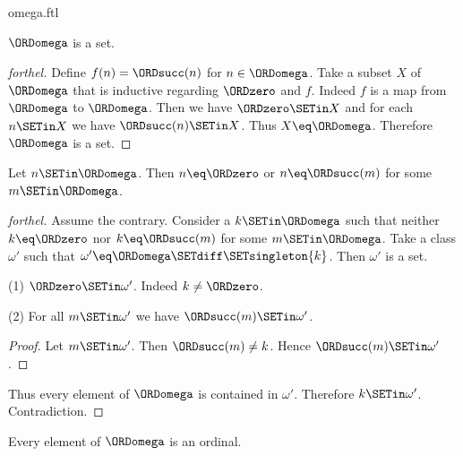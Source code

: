 \documentclass{stex}
\begin{document}
\begin{smodule}{omega.ftl}
\begin{corollary}[forthel,id=SET_THEORY_03_4847727433220096]
  $\ORDomega$ is a set.
\end{corollary}
\begin{proof}[forthel]
  Define $f(n) = \ORDsucc(n)$ for $n \in \ORDomega$.
  Take a subset $X$ of $\ORDomega$ that is inductive regarding $\ORDzero$ and $f$.
  Indeed $f$ is a map from $\ORDomega$ to $\ORDomega$.
  Then we have $\ORDzero \SETin X$ and for each $n \SETin X$ we have $\ORDsucc(n) \SETin X$.
  Thus $X \eq \ORDomega$.
  Therefore $\ORDomega$ is a set.
\end{proof}

\begin{proposition}[forthel,id=SET_THEORY_03_5885789275684864]
  Let $n \SETin \ORDomega$.
  Then $n \eq \ORDzero$ or $n \eq \ORDsucc(m)$ for some $m \SETin \ORDomega$.
\end{proposition}
\begin{proof}[forthel]
  Assume the contrary.
  Consider a $k \SETin \ORDomega$ such that neither $k \eq \ORDzero$ nor $k \eq \ORDsucc(m)$ for
  some $m \SETin \ORDomega$.
  Take a class $\omega'$ such that $\omega' \eq \ORDomega \SETdiff \SETsingleton{k}$. %
  Then $\omega'$ is a set.

  (1) $\ORDzero \SETin \omega'$.
  Indeed $k \neq \ORDzero$.

  (2) For all $m \SETin \omega'$ we have $\ORDsucc(m) \SETin \omega'$.
  \begin{proof}
    Let $m \SETin \omega'$.
    Then $\ORDsucc(m) \neq k$.
    Hence $\ORDsucc(m) \SETin \omega'$.
  \end{proof}

  Thus every element of $\ORDomega$ is contained in $\omega'$.
  Therefore $k \SETin \omega'$.
  Contradiction.
\end{proof}

\begin{proposition}[forthel,id=SET_THEORY_03_5057540872208384]
  Every element of $\ORDomega$ is an ordinal.
\end{proposition}
\end{smodule}
\end{document}
